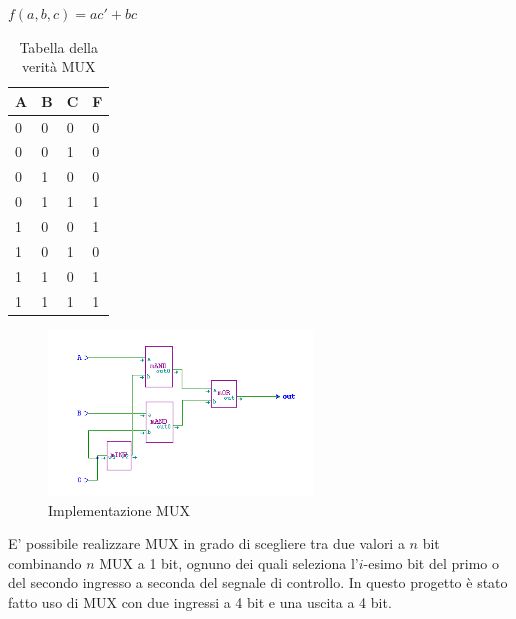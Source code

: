 \documentclass[10pt]{article}
\begin{document}
\begin{itemize}
$f(a,b,c) = ac' + bc$

\begin{table}[H]
    \begin{minipage}[b]{0.4\textwidth}
    \centering
        \begin{tabular}{|lll|l|}
        \hline
        \textbf{A} & \textbf{B} & \textbf{C} & \textbf{F} \\ \hline
        0          & 0          & 0          & 0          \\ 
        0          & 0          & 1          & 0          \\ 
        0          & 1          & 0          & 0          \\ 
        0          & 1          & 1          & 1          \\ 
        1          & 0          & 0          & 1          \\ 
        1          & 0          & 1          & 0          \\ 
        1          & 1          & 0          & 1          \\ 
        1          & 1          & 1          & 1          \\ \hline
        \end{tabular}
        \caption{Tabella della verità MUX}
        \label{tab:my-table}
    \end{minipage}
    \end{table}
    
    \begin{figure}[H]
    \begin{minipage}[b]{\textwidth}
    \centering
    \includegraphics[width=70mm]{mux1}
    \caption{Implementazione MUX}
    \label{ }
    \end{minipage}
    \end{figure}

E' possibile realizzare MUX in grado di scegliere tra due valori a $n$ bit combinando $n$ MUX a 1 bit, ognuno dei quali seleziona
l'$i$-esimo bit del primo o del secondo ingresso a seconda del segnale di controllo. In questo progetto è stato fatto uso di MUX con due ingressi a 4 bit e una uscita a 4 bit. 


\end{itemize}
\end{document}
